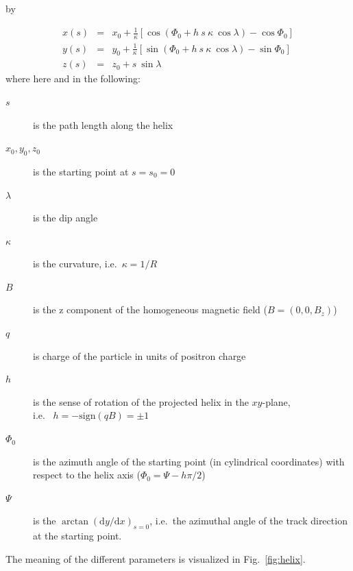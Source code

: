 \documentclass[twoside]{article}
\newcommand{\entrylabel}[1]{\mbox{\textbf{{#1}}}\hfil}%
\newenvironment{entry}
{\begin{list}{}%
    {\renewcommand{\makelabel}{\entrylabel}%
     \setlength{\labelwidth}{90pt}%
     \setlength{\leftmargin}{\labelwidth}
     \advance\leftmargin by \labelsep%
      }%
    }%
  {\end{list}}
\newcommand{\Entrylabel}[1]%
{\raisebox{0pt}[1ex][0pt]{\makebox[\labelwidth][l]%
    {\parbox[t]{\labelwidth}{\hspace{0pt}\textbf{{#1}}}}}}
\newenvironment{Entry}%
{\renewcommand{\entrylabel}{\Entrylabel}\begin{entry}}%
  {\end{entry}}
\begin{document}
\begin{description}
\begin{Entry}
\begin{eqnarray}
    x(s) & = & x_0 + \frac{1}{\kappa} [\cos(\Phi_0 + h\ s\ \kappa\ \cos\lambda) - \cos\Phi_0] \label{eq:xs} \\
    y(s) & = & y_0 + \frac{1}{\kappa} [\sin(\Phi_0 + h\ s\ \kappa\ \cos\lambda) - \sin\Phi_0] \label{eq:ys} \\
    z(s) & = & z_0 + s\ \sin\lambda \label{eq:zs}
\end{eqnarray}
where here and in the following:
\begin{description}
\item[$s$] is the path length along the helix
\item[$x_0, y_0, z_0$] is the starting point at $s = s_0 = 0$
\item[$\lambda$] is the dip angle
\item[$\kappa$] is the curvature, i.e.~$\kappa = 1/R$
\item[$B$] is the z component of the homogeneous magnetic field ($B = (0, 0, B_z)$)
\item[$q$] is charge of the particle in units of positron charge
\item[$h$] is the sense of rotation of the projected helix in the $xy$-plane,\\
           i.e.~ $h = -\mathrm{sign}(q B) = \pm 1$
\item[$\Phi_0$] is the azimuth angle of the starting point (in
                cylindrical coordinates) with respect to the helix axis ($\Phi_0 =
                \Psi - h \pi/2$)
\item[$\Psi$] is the $\arctan(\mathrm{d}y/\mathrm{d}x)_{s = 0}$,
              i.e.~the azimuthal angle of the track direction at the starting point.
\end{description}
The meaning of the different parameters is visualized in Fig.~\ref{fig:helix}.


\end{Entry}
\end{description}
\end{document}
